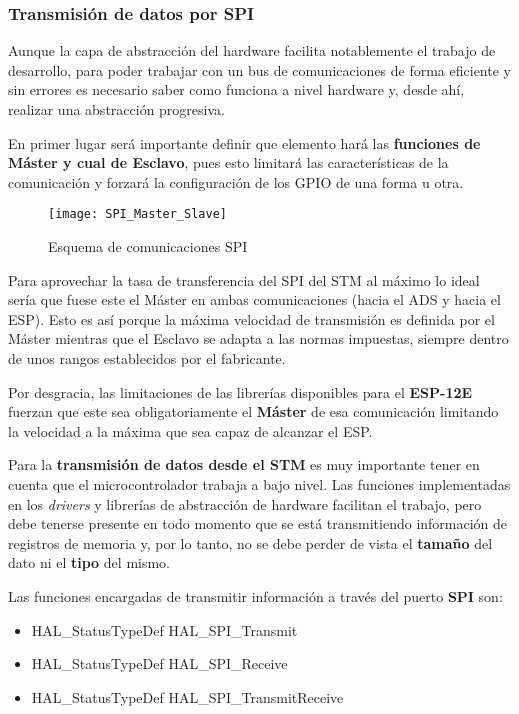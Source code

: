 \subsubsection{Transmisión de datos por SPI \label{sec:Software_micro_SPI}}

Aunque la capa de abstracción del hardware facilita notablemente el trabajo de desarrollo, para poder trabajar con un bus de comunicaciones de forma eficiente y sin errores es necesario saber como funciona a nivel hardware y, desde ahí, realizar una abstracción progresiva. 

En primer lugar será importante definir que elemento hará las \textbf{funciones de Máster y cual de Esclavo}, pues esto limitará las características de la comunicación y forzará la configuración de los \acrshort{GPIO} de una forma u otra.

\begin{figure} [h]
    \centering
    \texttt{[image: SPI\_Master\_Slave]}
    \caption{Esquema de comunicaciones SPI \cite{wikipedia}}
    \label{fig:SPI_Master_Slave}
\end{figure}

Para aprovechar la tasa de transferencia del SPI del STM al máximo lo ideal sería que fuese este el Máster en ambas comunicaciones (hacia el ADS y hacia el ESP). Esto es así porque la máxima velocidad de transmisión es definida por el Máster mientras que el Esclavo se adapta a las normas impuestas, siempre dentro de unos rangos establecidos por el fabricante.

Por desgracia, las limitaciones de las librerías disponibles para el \textbf{ESP-12E} fuerzan que este sea obligatoriamente el \textbf{Máster} de esa comunicación limitando la velocidad a la máxima que sea capaz de alcanzar el ESP.

Para la \textbf{transmisión de datos desde el STM} es muy importante tener en cuenta que el microcontrolador trabaja a bajo nivel. Las funciones implementadas en los \textit{drivers} y librerías de abstracción de hardware facilitan el trabajo, pero debe tenerse presente en todo momento que se está transmitiendo información de registros de memoria y, por lo tanto, no se debe perder de vista el \textbf{tamaño} del dato ni el \textbf{tipo} del mismo.

Las funciones encargadas de transmitir información a través del puerto \textbf{\acrshort{SPI}} son:
\begin{itemize}
\item HAL\_StatusTypeDef HAL\_SPI\_Transmit
\item HAL\_StatusTypeDef HAL\_SPI\_Receive
\item HAL\_StatusTypeDef HAL\_SPI\_TransmitReceive
\end{itemize}

